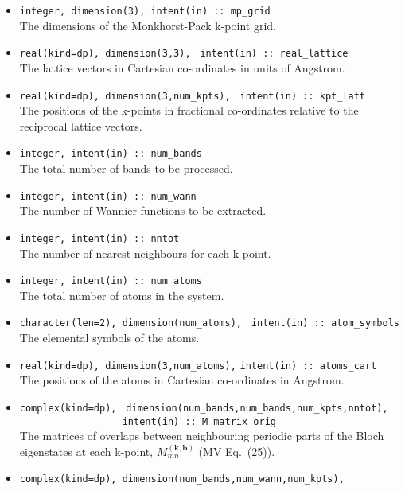 \begin{itemize}
\item \verb#integer, dimension(3), intent(in) :: mp_grid#\\ The
  dimensions of the {Monkhorst-Pack} k-point grid.
\item \verb#real(kind=dp), dimension(3,3),#
      \verb# intent(in) :: real_lattice#\\ The lattice vectors in
      Cartesian co-ordinates in units of Angstrom. 
\item \verb#real(kind=dp), dimension(3,num_kpts),#
      \verb# intent(in) :: kpt_latt#\\ The positions of the k-points in
      fractional co-ordinates relative to the reciprocal lattice
      vectors.
\item \verb#integer, intent(in) :: num_bands#\\ The total number of
      bands to be processed.
\item \verb#integer, intent(in) :: num_wann#\\ The number of Wannier
  functions to be extracted.
\item \verb#integer, intent(in) :: nntot#\\ The number of
  nearest neighbours for each k-point.
\item \verb#integer, intent(in) :: num_atoms#\\ The total number of atoms
  in the system.
\item \verb#character(len=2), dimension(num_atoms),#
      \verb# intent(in) :: atom_symbols#\\ The elemental symbols of
      the atoms.
\item \verb#real(kind=dp), dimension(3,num_atoms),#
      \verb#intent(in) :: atoms_cart#\\ The positions of the atoms in
      Cartesian co-ordinates in Angstrom.
\item \verb#complex(kind=dp),#
      \verb# dimension(num_bands,num_bands,num_kpts,nntot),#\\
      \verb#                  intent(in) :: M_matrix_orig#\\ 
      The matrices of overlaps between neighbouring periodic parts of
      the Bloch eigenstates at each k-point, $M_{mn}^{(\mathbf{k,b})}$
      (MV Eq.~(25)).
\item \verb#complex(kind=dp), dimension(num_bands,num_wann,num_kpts),#\\

\end{itemize}
